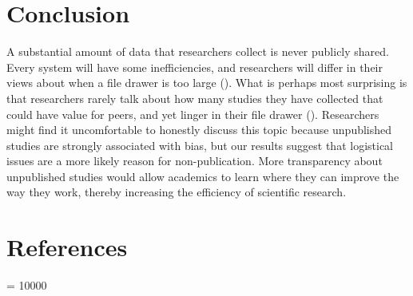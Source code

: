 \documentclass[
  ,man, a4paper,floatsintext]{apa6}
\begin{document}
\section{Conclusion}\label{conclusion}

A substantial amount of data that researchers collect is never publicly shared. Every system will have some inefficiencies, and researchers will differ in their views about when a file drawer is too large (). What is perhaps most surprising is that researchers rarely talk about how many studies they have collected that could have value for peers, and yet linger in their file drawer (). Researchers might find it uncomfortable to honestly discuss this topic because unpublished studies are strongly associated with bias, but our results suggest that logistical issues are a more likely reason for non-publication. More transparency about unpublished studies would allow academics to learn where they can improve the way they work, thereby increasing the efficiency of scientific research.

\section{References}\label{references}

\begingroup

\interlinepenalty = 10000
\end{document}
